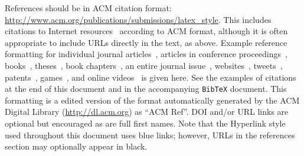 \documentclass[sigchi-a, authorversion]{acmart}
\begin{document}
References should be in ACM citation format:
\url{http://www.acm.org/publications/submissions/latex_style}.  This
includes citations to Internet
resources~\cite{CHINOSAUR:venue,cavender:writing,psy:gangnam}
according to ACM format, although it is often appropriate to include
URLs directly in the text, as above. Example reference formatting for
individual journal articles~\cite{ethics}, articles in conference
proceedings~\cite{Klemmer:2002:WSC:503376.503378},
books~\cite{Schwartz:1995:GBF}, theses~\cite{sutherland:sketchpad},
book chapters~\cite{winner:politics}, an entire journal
issue~\cite{kaye:puc},
websites~\cite{acm_categories,cavender:writing},
tweets~\cite{CHINOSAUR:venue}, patents~\cite{heilig:sensorama},
games~\cite{supermetroid:snes}, and
online videos~\cite{psy:gangnam} is given here.  See the examples of
citations at the end of this document and in the accompanying
\texttt{BibTeX} document. This formatting is a edited version of the
format automatically generated by the ACM Digital Library
(\url{http://dl.acm.org}) as ``ACM Ref''. DOI and/or URL links are
optional but encouraged as are full first names. Note that the
Hyperlink style used throughout this document uses blue links;
however, URLs in the references section may optionally appear in
black.







\end{document}
